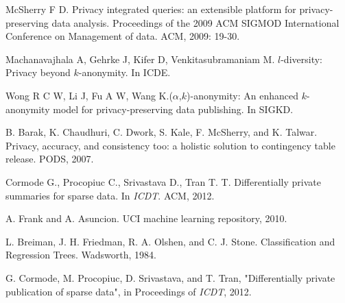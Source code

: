 \begin{thebibliography}{1}
McSherry F D. Privacy integrated queries: an extensible platform for privacy-preserving data analysis. Proceedings of the 2009 ACM SIGMOD International Conference on Management of data. ACM, 2009: 19-30.



 Machanavajhala A, Gehrke J, Kifer D, Venkitasubramaniam M. $l$-diversity: Privacy beyond $k$-anonymity. In ICDE.


 Wong R C W, Li J, Fu A W, Wang K.($\alpha$,$k$)-anonymity: An enhanced $k$-anonymity model for privacy-preserving data publishing. In SIGKD.





B. Barak, K. Chaudhuri, C. Dwork, S. Kale, F. McSherry, and K. Talwar. Privacy, accuracy, and consistency too: a holistic solution to contingency table release. PODS, 2007.





Cormode G., Procopiuc C., Srivastava D., Tran T. T. Differentially private summaries for sparse data. In {\it ICDT}. ACM, 2012.






A. Frank and A. Asuncion. UCI machine learning repository, 2010.



 L. Breiman, J. H. Friedman, R. A. Olshen, and C. J. Stone. Classification and Regression Trees. Wadsworth, 1984.

G. Cormode, M. Procopiuc, D. Srivastava, and T. Tran, "Differentially
private publication of sparse data", in Proceedings of {\it ICDT}, 2012.

\end{thebibliography}